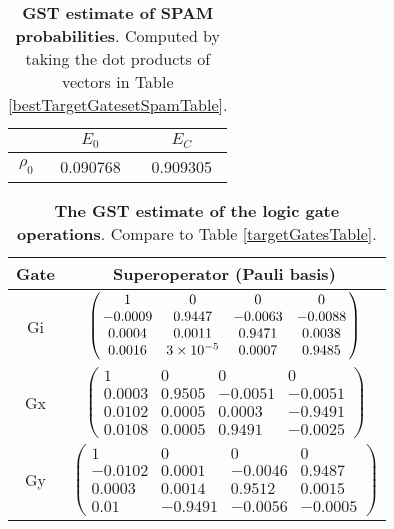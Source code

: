 {\begin{table}[h]
\begin{center}
\begin{tabular}[l]{|c|c|c|}
\hline
 & $E_{0}$ & $E_C$ \\ \hline
$\rho_{0}$ & 0.090768 & 0.909305 \\ \hline
\end{tabular}

\caption{\textbf{GST estimate of SPAM probabilities}.  Computed by taking the dot products of vectors in Table \ref{bestTargetGatesetSpamTable}.\label{bestTargetGatesetSpamParametersTable}}
\end{center}
\end{table}

\begin{table}[h]
\begin{center}
\begin{tabular}[l]{|c|c|}
\hline
Gate & Superoperator (Pauli basis) \\ \hline
Gi & $ \left(\!\!\begin{array}{cccc}
1 & 0 & 0 & 0 \\ 
-0.0009 & 0.9447 & -0.0063 & -0.0088 \\ 
0.0004 & 0.0011 & 0.9471 & 0.0038 \\ 
0.0016 & 3\times 10^{-5} & 0.0007 & 0.9485
 \end{array}\!\!\right) $
 \\ \hline
Gx & $ \left(\!\!\begin{array}{cccc}
1 & 0 & 0 & 0 \\ 
0.0003 & 0.9505 & -0.0051 & -0.0051 \\ 
0.0102 & 0.0005 & 0.0003 & -0.9491 \\ 
0.0108 & 0.0005 & 0.9491 & -0.0025
 \end{array}\!\!\right) $
 \\ \hline
Gy & $ \left(\!\!\begin{array}{cccc}
1 & 0 & 0 & 0 \\ 
-0.0102 & 0.0001 & -0.0046 & 0.9487 \\ 
0.0003 & 0.0014 & 0.9512 & 0.0015 \\ 
0.01 & -0.9491 & -0.0056 & -0.0005
 \end{array}\!\!\right) $
 \\ \hline
\end{tabular}

\caption{\textbf{The GST estimate of the logic gate operations}.  Compare to Table \ref{targetGatesTable}.\label{bestTargetGatesetGatesTable}}
\end{center}
\end{table}

}
